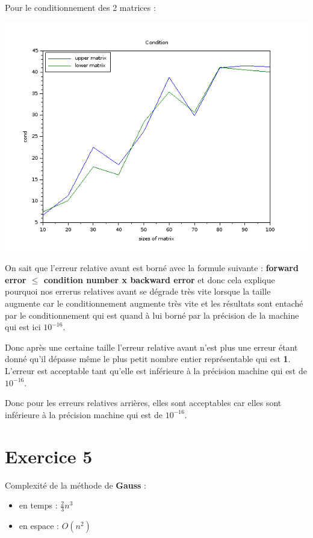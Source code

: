 \documentclass[12pt, letterpaper]{article}
\begin{document}
Pour le conditionnement des 2 matrices :

\includegraphics[scale=0.5]{img/condb.png}

On sait que l'erreur relative avant est borné avec la formule suivante
: \textbf{forward error $\le$ condition number x backward error} et
donc cela explique pourquoi nos errerus relatives avant se
dégrade très vite lorsque la taille augmente car le conditionnement
augmente très vite et les résultats sont entaché par le
conditionnement qui est quand à lui borné par la précision de la
machine qui est ici $10^{-16}$. \newline

Donc après une certaine taille l'erreur relative avant n'est plus une
erreur étant donné qu'il dépasse même le plus petit nombre entier
représentable qui est \textbf{1}. L'erreur est acceptable tant qu'elle
est inférieure à la précision machine qui est de $10^{-16}$. \newline

Donc pour les erreurs relatives arrières, elles sont acceptables car
elles sont inférieure à la précision machine qui est de
$10^{-16}$. \newline

\section*{Exercice 5}

Complexité de la méthode de \textbf{Gauss} :

\begin{itemize}
\item en temps  : $\frac{2}{3} n^3$
\item en espace : $O(n^2)$
\end{itemize}
\end{document}
